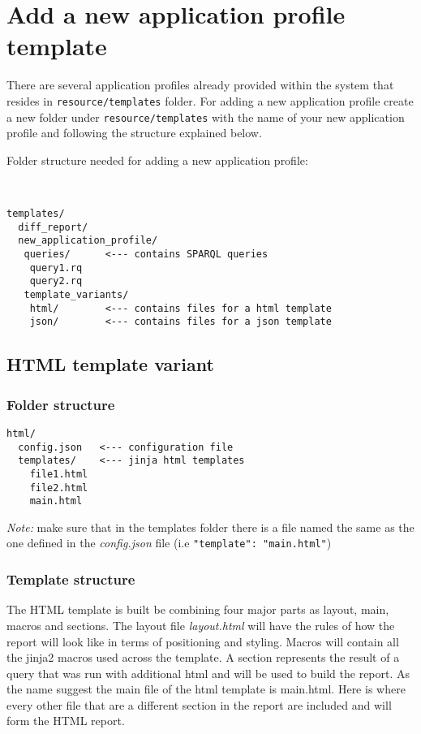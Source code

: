 \section{Add a new application profile template}

There are several application profiles already provided within the system that resides in \texttt{resource\slash templates} folder. For adding a new application profile create a new folder under \texttt{resource\slash templates} with the name of your new application profile and following the structure explained below.

Folder structure needed for adding a new application profile:

~
~
~

\begin{lstlisting}
templates/
  diff_report/
  new_application_profile/
   queries/      <--- contains SPARQL queries
    query1.rq
    query2.rq
   template_variants/
    html/        <--- contains files for a html template
    json/        <--- contains files for a json template
\end{lstlisting}

\subsection{HTML template variant}
\subsubsection{Folder structure}

\begin{lstlisting}
html/
  config.json   <--- configuration file
  templates/    <--- jinja html templates
    file1.html
    file2.html
    main.html
\end{lstlisting}

\textit{Note:} make sure that in the templates folder there is a file named the same as the one defined in the \textit{config.json} file (i.e \texttt{"template": "main.html"})

\subsubsection{Template structure}

The HTML template is built be combining four major parts as layout, main, macros and sections. The layout file \textit{layout.html} will have the rules of how the report will look like in terms of positioning and styling. Macros will contain all the jinja2 macros used across the template. A section represents the result of a query that was run with additional html and will be used to build the report. As the name suggest the main file of the html template is main.html. Here is where every other file that are a different section in the report are included and will form the HTML report.

